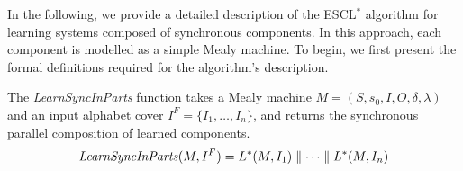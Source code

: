 In the following, we provide a detailed description of the ESCL$^*$ algorithm for learning systems composed of synchronous components. In this approach, each component is modelled as a simple Mealy machine. To begin, we first present the formal definitions required for the algorithm's description.


	\begin{definition}[LearnSyncInParts]\label{def:learnparts}
	The \textit{LearnSyncInParts} function takes a Mealy machine $M = (S, s_0, I,O, \delta, \lambda)$ and an input alphabet
	cover $I^F =\{I_1,\dots, I_n\}$, and returns the synchronous parallel composition of learned components.
	\[{\it LearnSyncInParts}(M,I^F)=L^*(M,I_1)\parallel\dots\parallel L^*(M,I_n)\]
\end{definition}


%

